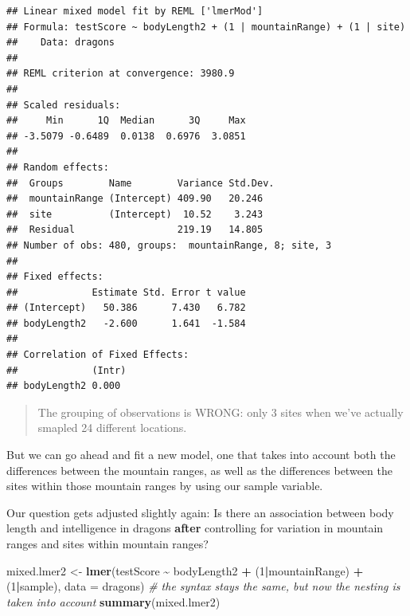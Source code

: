 \documentclass[
]{article}
\newenvironment{Shaded}{\begin{snugshade}}{\end{snugshade}}
\newcommand{\AttributeTok}[1]{\textcolor[rgb]{0.13,0.29,0.53}{#1}}
\newcommand{\CommentTok}[1]{\textcolor[rgb]{0.56,0.35,0.01}{\textit{#1}}}
\newcommand{\DecValTok}[1]{\textcolor[rgb]{0.00,0.00,0.81}{#1}}
\newcommand{\FunctionTok}[1]{\textcolor[rgb]{0.13,0.29,0.53}{\textbf{#1}}}
\newcommand{\NormalTok}[1]{#1}
\newcommand{\OtherTok}[1]{\textcolor[rgb]{0.56,0.35,0.01}{#1}}
\newcommand{\SpecialCharTok}[1]{\textcolor[rgb]{0.81,0.36,0.00}{\textbf{#1}}}
\begin{document}
\begin{verbatim}
## Linear mixed model fit by REML ['lmerMod']
## Formula: testScore ~ bodyLength2 + (1 | mountainRange) + (1 | site)
##    Data: dragons
## 
## REML criterion at convergence: 3980.9
## 
## Scaled residuals: 
##     Min      1Q  Median      3Q     Max 
## -3.5079 -0.6489  0.0138  0.6976  3.0851 
## 
## Random effects:
##  Groups        Name        Variance Std.Dev.
##  mountainRange (Intercept) 409.90   20.246  
##  site          (Intercept)  10.52    3.243  
##  Residual                  219.19   14.805  
## Number of obs: 480, groups:  mountainRange, 8; site, 3
## 
## Fixed effects:
##             Estimate Std. Error t value
## (Intercept)   50.386      7.430   6.782
## bodyLength2   -2.600      1.641  -1.584
## 
## Correlation of Fixed Effects:
##             (Intr)
## bodyLength2 0.000
\end{verbatim}

\begin{quote}
The grouping of observations is WRONG: only 3 sites when we've actually
smapled 24 different locations.
\end{quote}

But we can go ahead and fit a new model, one that takes into account
both the differences between the mountain ranges, as well as the
differences between the sites within those mountain ranges by using our
sample variable.

Our question gets adjusted slightly again: Is there an association
between body length and intelligence in dragons \textbf{after}
controlling for variation in mountain ranges and sites within mountain
ranges?

\begin{Shaded}
\begin{Highlighting}[]
\NormalTok{mixed.lmer2 }\OtherTok{\textless{}{-}} \FunctionTok{lmer}\NormalTok{(testScore }\SpecialCharTok{\textasciitilde{}}\NormalTok{ bodyLength2 }\SpecialCharTok{+}\NormalTok{ (}\DecValTok{1}\SpecialCharTok{|}\NormalTok{mountainRange) }\SpecialCharTok{+}\NormalTok{ (}\DecValTok{1}\SpecialCharTok{|}\NormalTok{sample), }\AttributeTok{data =}\NormalTok{ dragons)  }\CommentTok{\# the syntax stays the same, but now the nesting is taken into account}
\FunctionTok{summary}\NormalTok{(mixed.lmer2)}
\end{Highlighting}
\end{Shaded}
\end{document}
